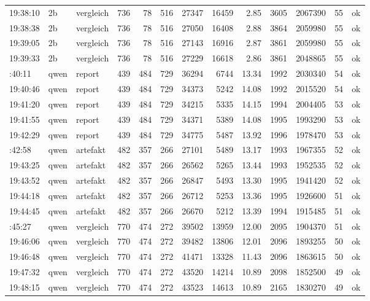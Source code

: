 {\begin{longtable}{lllrrrrrrrrrc}
19:38:10 & 2b   & vergleich & 736 &  78 & 516 & 27347 & 16459 &  2.85 & 3605 & 2067390 & 55 & ok \\
19:38:38 & 2b   & vergleich & 736 &  78 & 516 & 27050 & 16408 &  2.88 & 3864 & 2059980 & 55 & ok \\
19:39:05 & 2b   & vergleich & 736 &  78 & 516 & 27143 & 16916 &  2.87 & 3861 & 2059980 & 55 & ok \\
19:39:33 & 2b   & vergleich & 736 &  78 & 516 & 27229 & 16618 &  2.86 & 3861 & 2048865 & 55 & ok \\
\addlinespace
19:40:11 & qwen & report    & 439 & 484 & 729 & 36294 & 6744  & 13.34 & 1992 & 2030340 & 54 & ok \\
19:40:46 & qwen & report    & 439 & 484 & 729 & 34373 & 5242  & 14.08 & 1992 & 2015520 & 54 & ok \\
19:41:20 & qwen & report    & 439 & 484 & 729 & 34215 & 5335  & 14.15 & 1994 & 2004405 & 53 & ok \\
19:41:55 & qwen & report    & 439 & 484 & 729 & 34371 & 5389  & 14.08 & 1995 & 1993290 & 53 & ok \\
19:42:29 & qwen & report    & 439 & 484 & 729 & 34775 & 5487  & 13.92 & 1996 & 1978470 & 53 & ok \\
\addlinespace
19:42:58 & qwen & artefakt  & 482 & 357 & 266 & 27101 & 5489  & 13.17 & 1993 & 1967355 & 52 & ok \\
19:43:25 & qwen & artefakt  & 482 & 357 & 266 & 26562 & 5265  & 13.44 & 1993 & 1952535 & 52 & ok \\
19:43:52 & qwen & artefakt  & 482 & 357 & 266 & 26847 & 5493  & 13.30 & 1995 & 1941420 & 52 & ok \\
19:44:18 & qwen & artefakt  & 482 & 357 & 266 & 26712 & 5253  & 13.36 & 1995 & 1926600 & 51 & ok \\
19:44:45 & qwen & artefakt  & 482 & 357 & 266 & 26670 & 5212  & 13.39 & 1994 & 1915485 & 51 & ok \\
\addlinespace
19:45:27 & qwen & vergleich & 770 & 474 & 272 & 39502 & 13959 & 12.00 & 2095 & 1904370 & 51 & ok \\
19:46:06 & qwen & vergleich & 770 & 474 & 272 & 39482 & 13806 & 12.01 & 2096 & 1893255 & 50 & ok \\
19:46:48 & qwen & vergleich & 770 & 474 & 272 & 41471 & 13328 & 11.43 & 2096 & 1863615 & 50 & ok \\
19:47:32 & qwen & vergleich & 770 & 474 & 272 & 43520 & 14214 & 10.89 & 2098 & 1852500 & 49 & ok \\
19:48:15 & qwen & vergleich & 770 & 474 & 272 & 43523 & 14613 & 10.89 & 2165 & 1830270 & 49 & ok \\
\end{longtable}
}

